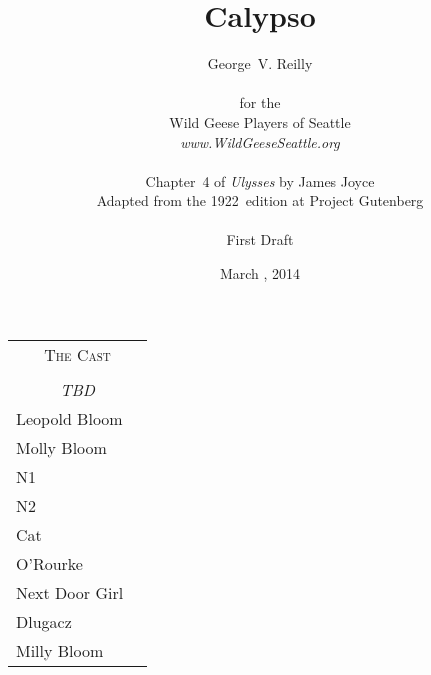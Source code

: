 


\title{\Huge Calypso}
\author{George~V. Reilly\\
\\
{\small for the}\\
Wild Geese Players of Seattle\\
{\emph{www.WildGeeseSeattle.org}}\\
\\
{\small Chapter~4 of \emph{Ulysses} by James Joyce}\\
{\small Adapted from the 1922~edition at Project Gutenberg}
\\
\\
{\small First Draft}}
\date{March , 2014}
\raggedbottom



\maketitle
\thispagestyle{empty}
\pagebreak

\begin{tabular}{lp{10cm}}
    \multicolumn{2}{c}{\Large \textsc{The Cast}} \\
\\
    \multicolumn{2}{c}{\large \textit{TBD}} \\
Leopold Bloom \\
Molly Bloom \\
N1 \\
N2 \\
Cat \\
O'Rourke \\
Next Door Girl \\
Dlugacz \\
Milly Bloom \\
\end{tabular}

\thispagestyle{empty}
\newpage


\setcounter{page}{1}






